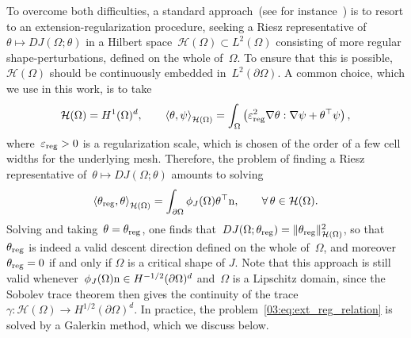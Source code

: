 To overcome both difficulties, a standard approach~(see for instance~\cite{DG06}) is to resort to an extension-regularization procedure, seeking a Riesz representative of~$\theta \mapsto D J(\Omega;\theta)$ in a Hilbert space~$\mathcal H(\Omega)\subset L^2(\Omega)$ consisting of more regular shape-perturbations, defined on the whole of~$\Omega$.
To ensure that this is possible,~$\mathcal H(\Omega)$ should be continuously embedded in~$L^2(\partial\Omega)$. 
A common choice, which we use in this work, is to take
\begin{equation}
    \label{03:eq:ext_reg_space}
    \mathcal H(\Omega) = H^1(\Omega)^d,\qquad \left\langle\theta,\psi\right\rangle_{\mathcal H(\Omega)} = \int_{\Omega} \left(\varepsilon_{\mathrm{reg}}^2\nabla\theta :\nabla\psi + \theta^\top\psi\right),
\end{equation}
where~$\varepsilon_{\mathrm{reg}}>0$ is a regularization scale, which is chosen of the order of a few cell widths for the underlying mesh. Therefore, the problem of finding a Riesz representative of~$\theta\mapsto DJ(\Omega;\theta)$ amounts to solving
\begin{equation}
    \label{03:eq:ext_reg_relation}
    \left\langle \theta_{\mathrm{reg}},\theta\right\rangle_{\mathcal H(\Omega)} = \int_{\partial\Omega}\phi_J(\Omega)\theta^\top\mathrm{n},\qquad\forall\,\theta\in \mathcal H(\Omega).
\end{equation}
Solving and taking~$\theta=\theta_{\mathrm{reg}}$, one finds that~$DJ(\Omega;\theta_{\mathrm{reg}})=\|\theta_{\mathrm{reg}}\|_{\mathcal H(\Omega)}^2$, so that~$\theta_{\mathrm{reg}}$ is indeed a valid descent direction defined on the whole of~$\Omega$, and moreover $\theta_{\mathrm{reg}}=0$ if and only if $\Omega$ is a critical shape of $J$. Note that this approach is still valid whenever~$\phi_J(\Omega)\mathrm{n}\in H^{-1/2}(\partial\Omega)^d$ and~$\Omega$ is a Lipschitz domain, since the Sobolev trace theorem then gives the continuity of the trace~$\gamma:\mathcal H(\Omega)\to H^{1/2}(\partial\Omega)^d$. In practice, the problem~\eqref{03:eq:ext_reg_relation} is solved by a Galerkin method, which we discuss below.

